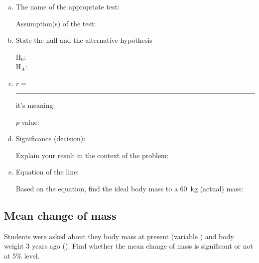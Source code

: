 \begin{enumerate}[a)]
	\item The name of the appropriate test:	
				\hrulefill 
				
		Assumption(s) of the test: \hrulefill
				
	\item	State the null and the alternative hypothesis
			
			H$_0$: 	\hrulefill 	\\
			H$_A$: \hrulefill 	
	\item
	
		$r=$  \rule{15mm}{.4pt}	\quad it's meaning: \hrulefill

		$p$-value:\hrulefill 	
		
	\item Significance (decision): \hrulefill
				
		Explain your result in the context of the problem: \hrulefill
	
		 \hrulefill
						
	\item Equation of the line: \hrulefill 	
		
		
		
			Based on the equation, find the ideal body mass to a 60~kg  (actual) mass: \hrulefill 
					
			 \hrulefill
				
 \end{enumerate}
 
 
 \subsection{Mean change of mass}
 Students were asked about they body mass at present (variable ) and body weight 3 years ago (). Find whether the mean change of mass is significant or not at 5\% level.
 
